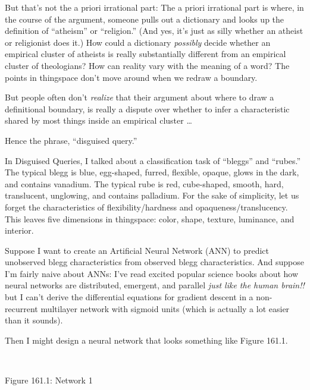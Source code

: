 {
 But that's not the a priori irrational part: The a
priori irrational part is where, in the course of the argument, someone
pulls out a dictionary and looks up the definition of
``atheism'' or
``religion.'' (And yes,
it's just as silly whether an atheist or religionist
does it.) How could a dictionary \textit{possibly} decide whether an
empirical cluster of atheists is really substantially different from an
empirical cluster of theologians? How can reality vary with the meaning
of a word? The points in thingspace don't move around
when we redraw a boundary.}

{
 But people often don't \textit{realize} that their
argument about where to draw a definitional boundary, is really a
dispute over whether to infer a characteristic shared by most things
inside an empirical cluster \ldots}

{
 Hence the phrase, ``disguised
query.''}

\myendsectiontext


{
 In Disguised Queries, I talked about a classification task of
``bleggs'' and
``rubes.'' The typical blegg is
blue, egg-shaped, furred, flexible, opaque, glows in the dark, and
contains vanadium. The typical rube is red, cube-shaped, smooth, hard,
translucent, unglowing, and contains palladium. For the sake of
simplicity, let us forget the characteristics of flexibility/hardness
and opaqueness/translucency. This leaves five dimensions in thingspace:
color, shape, texture, luminance, and interior. }

{
 Suppose I want to create an Artificial Neural Network (ANN) to
predict unobserved blegg characteristics from observed blegg
characteristics. And suppose I'm fairly naive about
ANNs: I've read excited popular science books about how
neural networks are distributed, emergent, and parallel \textit{just
like the human brain!!} but I can't derive the
differential equations for gradient descent in a non-recurrent
multilayer network with sigmoid units (which is actually a lot easier
than it sounds).}

{
 Then I might design a neural network that looks something like
Figure 161.1.}

{
 ~}

{\centering
{}
 \newline
 Figure 161.1: Network 1
\par}


